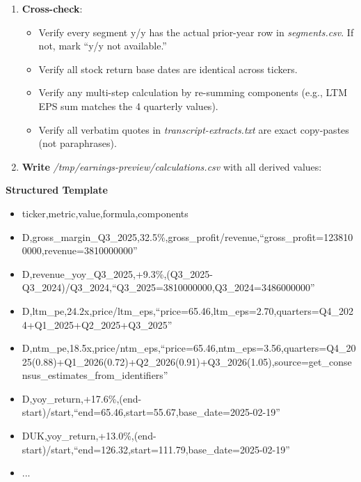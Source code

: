 \documentclass[11pt]{article}
\begin{document}
\begin{enumerate}[leftmargin=*,itemsep=2pt,topsep=2pt]
\begin{itemize}[leftmargin=*,itemsep=2pt,topsep=2pt]
\item {} Stock returns (YTD, 1-yr, 30d, 90d) = find the \textbf{common first date across all tickers} in \emph{prices.csv}, then compute returns from that date
\end{itemize}
\item {} \textbf{Cross-check}:
\begin{itemize}[leftmargin=*,itemsep=2pt,topsep=2pt]
\item {} Verify every segment y/y has the actual prior-year row in \emph{segments.csv}. If not, mark ``y/y not available.''
\item {} Verify all stock return base dates are identical across tickers.
\item {} Verify any multi-step calculation by re-summing components (e.g., LTM EPS sum matches the 4 quarterly values).
\item {} Verify all verbatim quotes in \emph{transcript-extracts.txt} are exact copy-pastes (not paraphrases).
\end{itemize}
\item {} \textbf{Write} \emph{/tmp/earnings-preview/calculations.csv} with all derived values:
\end{enumerate}
\textbf{Structured Template}
\begin{itemize}[leftmargin=*,itemsep=2pt,topsep=2pt]
\item {} ticker,metric,value,formula,components
\item {} D,gross\_\allowbreak{}margin\_\allowbreak{}Q3\_\allowbreak{}2025,32.5\%,gross\_\allowbreak{}profit/revenue,``gross\_\allowbreak{}profit=1238100000,revenue=3810000000''
\item {} D,revenue\_\allowbreak{}yoy\_\allowbreak{}Q3\_\allowbreak{}2025,+9.3\%,(Q3\_\allowbreak{}2025-Q3\_\allowbreak{}2024)/Q3\_\allowbreak{}2024,``Q3\_\allowbreak{}2025=3810000000,Q3\_\allowbreak{}2024=3486000000''
\item {} D,ltm\_\allowbreak{}pe,24.2x,price/ltm\_\allowbreak{}eps,``price=65.46,ltm\_\allowbreak{}eps=2.70,quarters=Q4\_\allowbreak{}2024+Q1\_\allowbreak{}2025+Q2\_\allowbreak{}2025+Q3\_\allowbreak{}2025''
\item {} D,ntm\_\allowbreak{}pe,18.5x,price/ntm\_\allowbreak{}eps,``price=65.46,ntm\_\allowbreak{}eps=3.56,quarters=Q4\_\allowbreak{}2025(0.88)+Q1\_\allowbreak{}2026(0.72)+Q2\_\allowbreak{}2026(0.91)+Q3\_\allowbreak{}2026(1.05),source=get\_\allowbreak{}consensus\_\allowbreak{}estimates\_\allowbreak{}from\_\allowbreak{}identifiers''
\item {} D,yoy\_\allowbreak{}return,+17.6\%,(end-start)/start,``end=65.46,start=55.67,base\_\allowbreak{}date=2025-02-19''
\item {} DUK,yoy\_\allowbreak{}return,+13.0\%,(end-start)/start,``end=126.32,start=111.79,base\_\allowbreak{}date=2025-02-19''
\item {} ...
\end{itemize}
\end{document}
